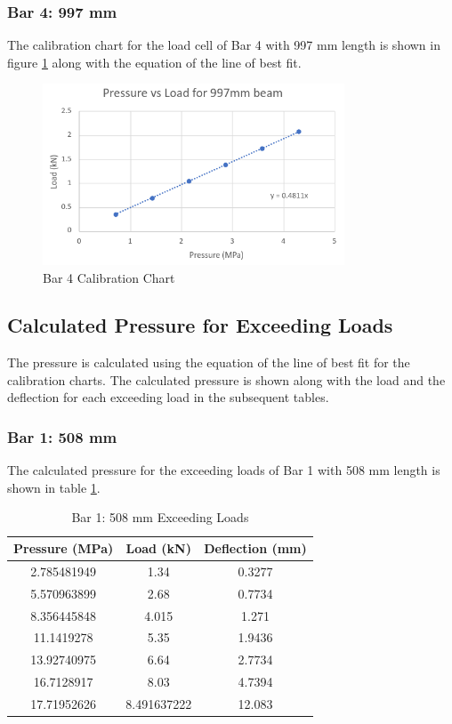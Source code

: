 \documentclass[12pt, titlepage]{article}
\begin{document}
\subsubsection{Bar 4: 997 mm}
The calibration chart for the load cell of Bar 4 with 997 mm length is shown
in figure \ref{fig:bar4calib} along with the equation of the line of best fit.
\begin{figure}[H]
    \centering
    \includegraphics[width=0.8\textwidth]{./Images/997.png}
    \caption{Bar 4 Calibration Chart}
    \label{fig:bar4calib}
\end{figure}
\newpage
\subsection{Calculated Pressure for Exceeding Loads}
The pressure is calculated using the equation of the line of best fit for the
calibration charts. The calculated pressure is shown along with the load and
the deflection for each exceeding load in the subsequent tables.
\subsubsection{Bar 1: 508 mm}
The calculated pressure for the exceeding loads of Bar 1 with 508 mm length
is shown in table \ref{tab:bar1exceed}.
\begin{table}[H]
    \centering
    \caption{Bar 1: 508 mm Exceeding Loads}
    \label{tab:bar1exceed}
    \begin{tabular}{|c|c|c|}
        \hline
        \textbf{Pressure (MPa)} & \textbf{Load (kN)} & \textbf{Deflection (mm)}\\
        \hline
        2.785481949 & 1.34 & 0.3277 \\
        \hline
        5.570963899 & 2.68 & 0.7734 \\
        \hline
        8.356445848 & 4.015 & 1.271 \\
        \hline
        11.1419278 & 5.35 & 1.9436 \\
        \hline
        13.92740975 & 6.64 & 2.7734 \\
        \hline
        16.7128917 & 8.03 & 4.7394 \\
        \hline
        17.71952626 & 8.491637222 & 12.083 \\
        \hline
    \end{tabular}
\end{table}
\end{document}
